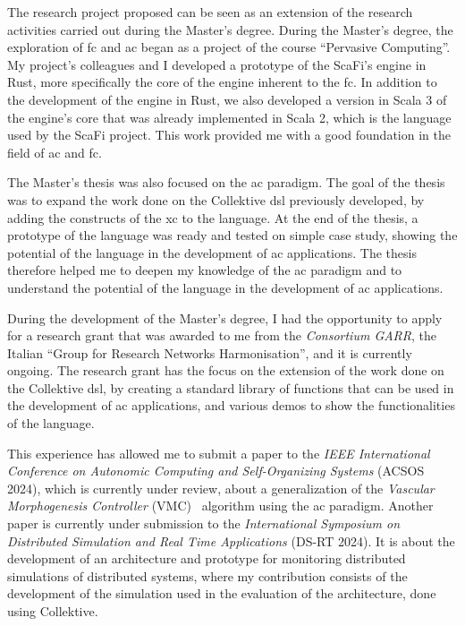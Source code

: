 \documentclass[12pt, a4paper]{article}
\begin{document}
The research project proposed can be seen as an extension of the research activities
carried out during the Master's degree.
%
During the Master's degree,
the exploration of \ac{fc} and \ac{ac} began as a project of the course ``Pervasive Computing''.
%
My project's colleagues and I developed a prototype of the ScaFi's engine in Rust,
more specifically the core of the engine inherent to the \ac{fc}.
%
In addition to the development of the engine in Rust,
we also developed a version in Scala 3 of the engine's core that was already implemented in Scala 2,
which is the language used by the ScaFi project.
%
This work provided me with a good foundation in the field of \ac{ac} and \ac{fc}.

The Master's thesis was also focused on the \ac{ac} paradigm.
%
The goal of the thesis was to expand the work done on the Collektive \ac{dsl} previously developed,
by adding the constructs of the \ac{xc} to the language.
%
At the end of the thesis, a prototype of the language was ready and tested on simple case study,
showing the potential of the language in the development of \ac{ac} applications.
%
The thesis therefore helped me to deepen my knowledge of the \ac{ac} paradigm and to understand the potential
of the language in the development of \ac{ac} applications.

During the development of the Master's degree,
I had the opportunity to apply for a research grant that was awarded to me from the \emph{Consortium GARR},
the Italian ``Group for Research Networks Harmonisation'',
and it is currently ongoing.
%
The research grant has the focus on the extension of the work done on the Collektive \ac{dsl},
by creating a standard library of functions that can be used in the development of \ac{ac} applications,
and various demos to show the functionalities of the language.

This experience has allowed me to submit a paper to the \emph{IEEE International Conference on Autonomic Computing and Self-Organizing Systems} (ACSOS 2024),
which is currently under review,
about a generalization of the \emph{Vascular Morphogenesis Controller} (VMC)~\cite{ZahadatHS17} algorithm using the \ac{ac} paradigm.
%
Another paper is currently under submission to the \emph{International Symposium on Distributed Simulation and Real Time Applications} (DS-RT 2024).
%
It is about the development of an architecture and prototype
for monitoring distributed simulations of distributed systems,
where my contribution consists of the development of the simulation used in the evaluation of the architecture,
done using Collektive.
\end{document}
